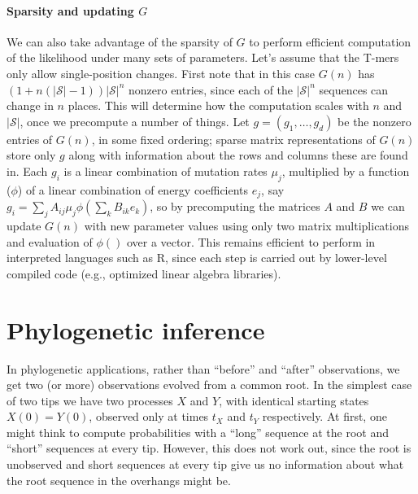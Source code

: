 \documentclass{article}
\newcommand{\calS}{\mathcal{S}}  %
\theoremstyle{plain}
\theoremstyle{definition}
\begin{document}
\paragraph{Sparsity and updating $G$}
We can also take advantage of the sparsity of $G$ to perform efficient computation of the likelihood
under many sets of parameters.
Let's assume that the T-mers only allow single-position changes.
First note that in this case $G(n)$ has
$(1+n(|\calS|-1)) |\calS|^{n}$ nonzero entries,
since each of the $|\calS|^{n}$ sequences can change in $n$ places.
This will determine how the computation scales with $n$ and $|\calS|$,
once we precompute a number of things.
Let $g = (g_1, \ldots, g_d)$ be the nonzero entries of $G(n)$, in some fixed ordering;
sparse matrix representations of $G(n)$ store only $g$ along with information about the rows and columns these are found in.
Each $g_i$ is a linear combination of mutation rates $\mu_j$,
multiplied by a function ($\phi$) of a linear combination of energy coefficients $e_j$,
say $g_i = \sum_j A_{ij} \mu_j \phi(\sum_k B_{ik} e_k)$,
so by precomputing the matrices $A$ and $B$ we can update $G(n)$ with new parameter values
using only two matrix multiplications and evaluation of $\phi()$ over a vector.
This remains efficient to perform in interpreted languages such as R,
since each step is carried out by lower-level compiled code (e.g., optimized linear algebra libraries).

\section{Phylogenetic inference}

In phylogenetic applications, rather than ``before'' and ``after'' observations,
we get two (or more) observations evolved from a common root.
In the simplest case of two tips we have two processes $X$ and $Y$,
with identical starting states $X(0)=Y(0)$,
observed only at times $t_X$ and $t_Y$ respectively.
At first, one might think to compute probabilities
with a ``long'' sequence at the root and ``short'' sequences at every tip.
However, this does not work out, since the root is unobserved
and short sequences at every tip give us no information about what the root sequence
in the overhangs might be.
\end{document}
